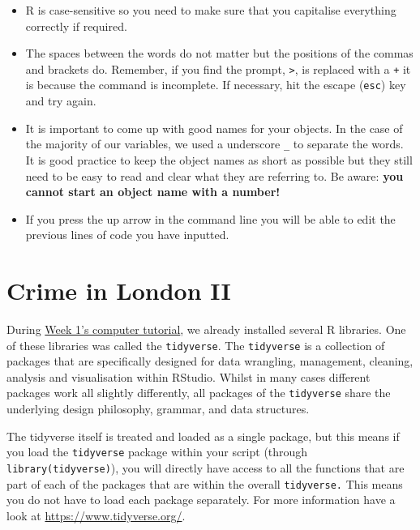 \documentclass[
]{book}
\providecommand{\tightlist}{%
  \setlength{\itemsep}{0pt}\setlength{\parskip}{0pt}}
\begin{document}
\begin{itemize}
\tightlist
\item
  R is case-sensitive so you need to make sure that you capitalise everything correctly if required.
\item
  The spaces between the words do not matter but the positions of the commas and brackets do. Remember, if you find the prompt, \texttt{\textgreater{}}, is replaced with a \texttt{+} it is because the command is incomplete. If necessary, hit the escape (\texttt{esc}) key and try again.
\item
  It is important to come up with good names for your objects. In the case of the majority of our variables, we used a underscore \texttt{\_} to separate the words. It is good practice to keep the object names as short as possible but they still need to be easy to read and clear what they are referring to. Be aware: \textbf{you cannot start an object name with a number!}
\item
  If you press the up arrow in the command line you will be able to edit the previous lines of code you have inputted.
\end{itemize}

\hypertarget{crime-in-london-ii}{%
\section{Crime in London II}\label{crime-in-london-ii}}

During \protect\hyperlink{geocomputation-an-introduction.htmlux5cux23r-package-installation}{Week 1's computer tutorial}, we already installed several R libraries. One of these libraries was called the \texttt{tidyverse}. The \texttt{tidyverse} is a collection of packages that are specifically designed for data wrangling, management, cleaning, analysis and visualisation within RStudio. Whilst in many cases different packages work all slightly differently, all packages of the \texttt{tidyverse} share the underlying design philosophy, grammar, and data structures.

The tidyverse itself is treated and loaded as a single package, but this means if you load the \texttt{tidyverse} package within your script (through \texttt{library(tidyverse)}), you will directly have access to all the functions that are part of each of the packages that are within the overall \texttt{tidyverse.} This means you do not have to load each package separately. For more information have a look at \url{https://www.tidyverse.org/}.
\end{document}
